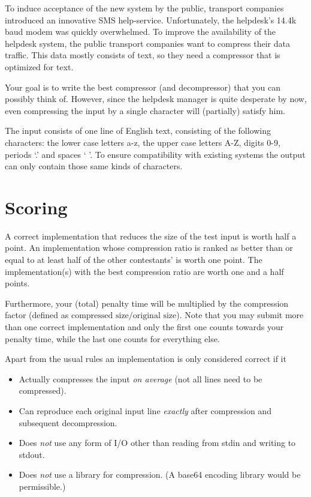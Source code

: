 


{\StandaardZin}
To induce acceptance of the new system by the public, transport companies introduced an innovative SMS help-service.  Unfortunately, the helpdesk's 14.4k baud modem was quickly overwhelmed. To improve the availability of the helpdesk system, the public transport companies want to compress their data traffic.
This data mostly consists of text, so they need a compressor that is optimized for text.

Your goal is to write the best compressor (and decompressor) that you can possibly think of.  However, since the helpdesk manager is quite desperate by now, even compressing the input by a single character will (partially) satisfy  him.

The input consists of one line of English text, consisting of the following characters: the lower case letters a-z, the upper case letters A-Z, digits 0-9, periods `.' and spaces ` '.
To ensure compatibility with existing systems the output can only contain those same kinds of characters.

\section*{Scoring}

A correct implementation that reduces the size of the test input is worth half a point.  An implementation whose compression ratio is ranked as better than or equal to at least half of the other contestants' is worth one point.  The implementation(s) with the best compression ratio are worth one and a half points.

Furthermore, your (total) penalty time will be multiplied by the compression factor (defined as $\mbox{compressed size}/\mbox{original size}$).
Note that you may submit more than one correct implementation and only the first one counts towards your penalty time, while the last one counts for everything else.

Apart from the usual rules an implementation is only considered correct if it
\begin{itemize}
\item Actually compresses the input \emph{on average} (not all lines need to be compressed).
\item Can reproduce each original input line \textit{exactly} after compression and subsequent decompression.
\item Does \textit{not} use any form of I/O other than reading from stdin and writing to stdout.
\item Does \textit{not} use a library for compression. (A base64 encoding library would be permissible.)
\end{itemize}

